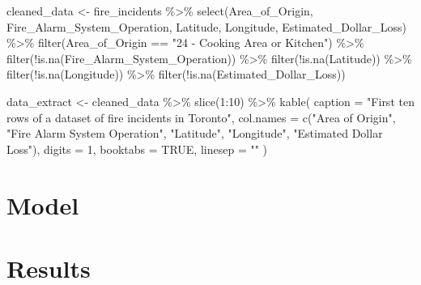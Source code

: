 \documentclass[
]{article}
\newenvironment{Shaded}{\begin{snugshade}}{\end{snugshade}}
\newcommand{\AttributeTok}[1]{\textcolor[rgb]{0.77,0.63,0.00}{#1}}
\newcommand{\ConstantTok}[1]{\textcolor[rgb]{0.00,0.00,0.00}{#1}}
\newcommand{\DecValTok}[1]{\textcolor[rgb]{0.00,0.00,0.81}{#1}}
\newcommand{\FunctionTok}[1]{\textcolor[rgb]{0.00,0.00,0.00}{#1}}
\newcommand{\NormalTok}[1]{#1}
\newcommand{\OtherTok}[1]{\textcolor[rgb]{0.56,0.35,0.01}{#1}}
\newcommand{\SpecialCharTok}[1]{\textcolor[rgb]{0.00,0.00,0.00}{#1}}
\newcommand{\StringTok}[1]{\textcolor[rgb]{0.31,0.60,0.02}{#1}}
\begin{document}
\begin{Shaded}
\begin{Highlighting}[]
\NormalTok{cleaned\_data }\OtherTok{\textless{}{-}}
\NormalTok{  fire\_incidents }\SpecialCharTok{\%\textgreater{}\%}
  \FunctionTok{select}\NormalTok{(Area\_of\_Origin, Fire\_Alarm\_System\_Operation, Latitude, Longitude, Estimated\_Dollar\_Loss) }\SpecialCharTok{\%\textgreater{}\%}
  \FunctionTok{filter}\NormalTok{(Area\_of\_Origin }\SpecialCharTok{==} \StringTok{"24 {-} Cooking Area or Kitchen"}\NormalTok{) }\SpecialCharTok{\%\textgreater{}\%}
  \FunctionTok{filter}\NormalTok{(}\SpecialCharTok{!}\FunctionTok{is.na}\NormalTok{(Fire\_Alarm\_System\_Operation)) }\SpecialCharTok{\%\textgreater{}\%}
  \FunctionTok{filter}\NormalTok{(}\SpecialCharTok{!}\FunctionTok{is.na}\NormalTok{(Latitude)) }\SpecialCharTok{\%\textgreater{}\%}
  \FunctionTok{filter}\NormalTok{(}\SpecialCharTok{!}\FunctionTok{is.na}\NormalTok{(Longitude)) }\SpecialCharTok{\%\textgreater{}\%}
  \FunctionTok{filter}\NormalTok{(}\SpecialCharTok{!}\FunctionTok{is.na}\NormalTok{(Estimated\_Dollar\_Loss))}

\NormalTok{data\_extract }\OtherTok{\textless{}{-}}
\NormalTok{  cleaned\_data }\SpecialCharTok{\%\textgreater{}\%} 
    \FunctionTok{slice}\NormalTok{(}\DecValTok{1}\SpecialCharTok{:}\DecValTok{10}\NormalTok{) }\SpecialCharTok{\%\textgreater{}\%}
      \FunctionTok{kable}\NormalTok{(}
      \AttributeTok{caption =} \StringTok{"First ten rows of a dataset of fire incidents in Toronto"}\NormalTok{,}
      \AttributeTok{col.names =} \FunctionTok{c}\NormalTok{(}\StringTok{"Area of Origin"}\NormalTok{, }\StringTok{"Fire Alarm System Operation"}\NormalTok{, }\StringTok{"Latitude"}\NormalTok{, }\StringTok{"Longitude"}\NormalTok{, }\StringTok{"Estimated Dollar Loss"}\NormalTok{),}
      \AttributeTok{digits =} \DecValTok{1}\NormalTok{,}
      \AttributeTok{booktabs =} \ConstantTok{TRUE}\NormalTok{, }
      \AttributeTok{linesep =} \StringTok{""}
\NormalTok{    )}
\end{Highlighting}
\end{Shaded}

\hypertarget{model}{%
\section{Model}\label{model}}

\hypertarget{results}{%
\section{Results}\label{results}}
\end{document}
